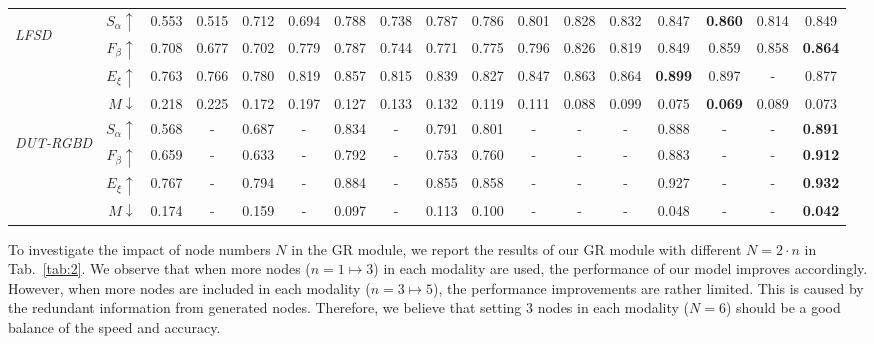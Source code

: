 \documentclass[runningheads]{llncs}
\begin{document}
\begin{table}[pt]
{\begin{tabular}{lr|ccccc|ccccccccc|c}
			\multirow{4}{*}{\begin{sideways}\textit{LFSD}\end{sideways}}
			& $S_{\alpha}\uparrow$ &0.553& 0.515 & 0.712 & 0.694 & 0.788 & 0.738 & 0.787  & 0.786 & 0.801 & 0.828 & 0.832 &0.847 &{\bf 0.860}&0.814& 0.849 \\
			& $F_{\beta}\uparrow$ &0.708& 0.677 & 0.702 & 0.779 & 0.787 & 0.744 & 0.771  & 0.775   & 0.796 & 0.826 & 0.819 &0.849 &0.859&0.858& {\bf 0.864} \\
			& $E_{\xi}\uparrow$ &0.763& 0.766 & 0.780 & 0.819 & 0.857 & 0.815 & 0.839  & 0.827   & 0.847 & 0.863 & 0.864 &{\bf0.899} &0.897&-&  0.877 \\
			& $M\downarrow$ &0.218& 0.225 & 0.172 & 0.197 & 0.127 & 0.133 & 0.132  & 0.119   & 0.111 & 0.088 & 0.099 &0.075 &{\bf 0.069}&0.089& 0.073 \\
			\midrule
			
			
			\multirow{4}{*}{\begin{sideways}\textit{DUT-RGBD}\end{sideways}}
			& $S_{\alpha}\uparrow$ &0.568& - & 0.687 &- & 0.834 & - & 0.791  & 0.801 & - & - & - &0.888 &-&-& {\bf 0.891} \\
			& $F_{\beta}\uparrow$ &0.659& - & 0.633 &- & 0.792 & - & 0.753  & 0.760   & - & - & - &0.883 &-&-& {\bf 0.912} \\
			& $E_{\xi}\uparrow$ &0.767&- & 0.794 &- & 0.884 & - & 0.855  & 0.858   & - & - & - &0.927 &-&-&  {\bf 0.932} \\
			& $M\downarrow$ &0.174&- & 0.159 & - & 0.097 & - & 0.113  & 0.100 & - & - & - &0.048 &-&-& {\bf0.042} \\
			\midrule
			
			
			\hline
		\end{tabular}
		\label{tab:3}
	}
\end{table}

 To investigate the impact of node numbers $N$ in the GR module, we report the results of our GR module with different $N = 2\cdot n$ in Tab.~\ref{tab:2}. We observe that when more nodes ($n = 1 \mapsto 3$) in each modality are used, the performance of our model improves accordingly. However, when more nodes are included in each modality ($n = 3 \mapsto 5$), the performance improvements are rather limited. This is caused by the redundant information from generated nodes. Therefore, we believe that setting $3$ nodes in each modality ($N=6$) should be a good balance of the speed and accuracy.  
\end{document}
